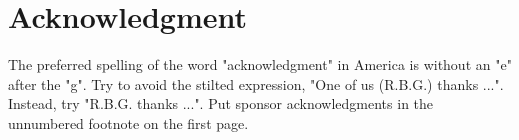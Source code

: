 %




\section*{Acknowledgment}

The preferred spelling of the word "acknowledgment" in America is without
an "e" after the "g". Try to avoid the stilted expression, "One of us
(R.B.G.) thanks ...". Instead, try "R.B.G. thanks ...". Put sponsor
acknowledgments in the unnumbered footnote on the first page.



